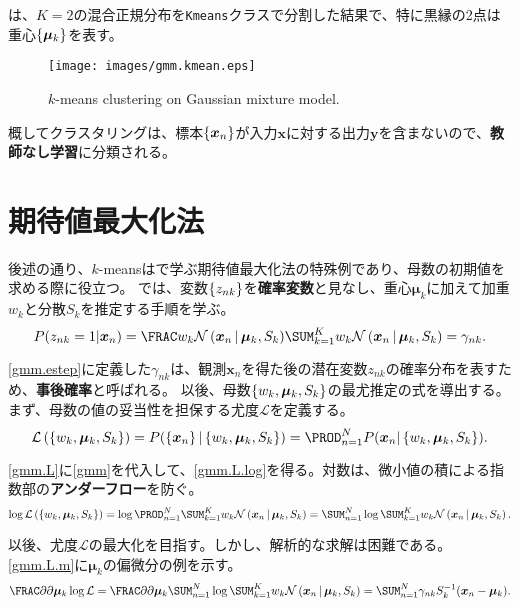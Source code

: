 \documentclass[10pt,a4paper]{book}
\begin{document}
は、$K\!=\!2$の混合正規分布を\texttt{Kmeans}クラスで分割した結果で、特に黒縁の2点は重心$\seq{\bm{\mu}_k}$を表す。

\begin{figure}[h]
\centering
\texttt{[image: images/gmm.kmean.eps]}
\caption{$k$-means clustering on Gaussian mixture model.\label{fig:gmm.kmean}}
\end{figure}

概してクラスタリングは、標本$\seq{\bm{x}_n}$が入力$\bm{x}$に対する出力$\bm{y}$を含まないので、\textbf{教師なし学習}に分類される。

\section{期待値最大化法\label{sect:gmm.em}}

後述の通り、$k$-meansはで学ぶ期待値最大化法の特殊例であり、母数の初期値を求める際に役立つ。
では、変数$\seq{z_{nk}}$を\textbf{確率変数}と見なし、重心$\bm{\mu}_k$に加えて加重$w_k$と分散$S_k$を推定する手順を学ぶ。
%
\begin{equation}
\label{eq:gmm.estep}
P(z_{nk}=1|\bm{x}_n) = \normal{k=1}{K}{w_k \Nd{\bm{x}_n}{\bm{\mu}_k,S_k}} = \gamma_{nk}.
\end{equation}

\eqref{gmm.estep}に定義した$\gamma_{nk}$は、観測$\bm{x}_n$を得た後の潜在変数$z_{nk}$の確率分布を表すため、\textbf{事後確率}と呼ばれる。
以後、母数$\seq{w_k,\bm{\mu}_k,S_k}$の最尤推定の式を導出する。まず、母数の値の妥当性を担保する尤度$\mathcal{L}$を定義する。
%
\begin{equation}
\label{eq:gmm.L}
\Lk{\seq{w_k,\bm{\mu}_k,S_k}} = P(\seq{\bm{x}_n}|\seq{w_k,\bm{\mu}_k,S_k}) = \prod_{n=1}^N P(\bm{x}_n|\seq{w_k,\bm{\mu}_k,S_k}).
\end{equation}

\eqref{gmm.L}に\eqref{gmm}を代入して、\eqref{gmm.L.log}を得る。対数は、微小値の積による指数部の\textbf{アンダーフロー}を防ぐ。
%
\begin{equation}
\label{eq:gmm.L.log}
\log \Lk{\seq{w_k,\bm{\mu}_k,S_k}}
= \log\prod_{n=1}^N \sum_{k=1}^K w_k \Nd{\bm{x}_n}{\bm{\mu}_k,S_k}
= \sum_{n=1}^N \log \sum_{k=1}^K w_k \Nd{\bm{x}_n}{\bm{\mu}_k,S_k}.
\end{equation}

以後、尤度$\mathcal{L}$の最大化を目指す。しかし、解析的な求解は困難である。\eqref{gmm.L.m}に$\bm{\mu}_k$の偏微分の例を示す。
%
\begin{equation}
\label{eq:gmm.L.m}
\pdiff{}{\bm{\mu}_k}\log\mathcal{L} =
\pdiff{}{\bm{\mu}_k}\sum_{n=1}^N \log\sum_{k=1}^K w_k \Nd{\bm{x}_n}{\bm{\mu}_k,S_k} =
\sum_{n=1}^N \gamma_{nk} S_k^{-1} (\bm{x}_n - \bm{\mu}_k).
\end{equation}
\end{document}
